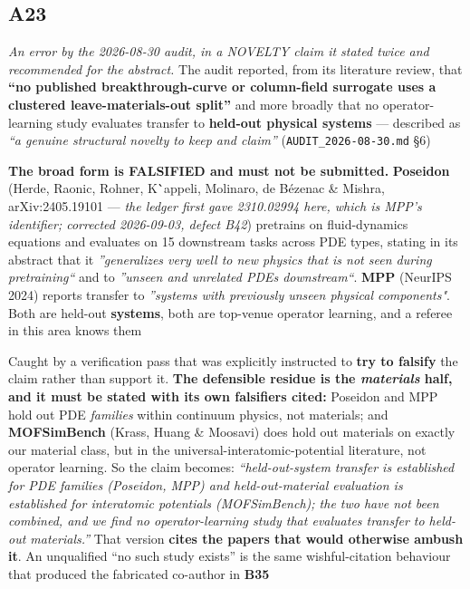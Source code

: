\documentclass[10pt]{article}
\begin{document}
\subsection*{A23}\label{led:A23}
\begin{description}[leftmargin=0pt,itemsep=1pt]
\item[Claim withdrawn.] \emph{An error by the 2026-08-30 audit, in a NOVELTY claim it stated twice and recommended for the abstract.} The audit reported, from its literature review, that \textbf{``no published breakthrough-curve or column-field surrogate uses a clustered leave-materials-out split''} and more broadly that no operator-learning study evaluates transfer to \textbf{held-out physical systems} --- described as \emph{``a genuine structural novelty to keep and claim''} (\texttt{AUDIT\_2026-08-30.md} §6)
\item[Replaced with.] \textbf{The broad form is FALSIFIED and must not be submitted.} \textbf{Poseidon} (Herde, Raonic, Rohner, K\``appeli, Molinaro, de B\'ezenac \& Mishra, arXiv:2405.19101 --- \emph{the ledger first gave 2310.02994 here, which is MPP's identifier; corrected 2026-09-03, defect B42}) pretrains on fluid-dynamics equations and evaluates on 15 downstream tasks across PDE types, stating in its abstract that it \emph{''generalizes very well to new physics that is not seen during pretraining``} and to \emph{''unseen and unrelated PDEs downstream``}. \textbf{MPP} (NeurIPS 2024) reports transfer to \emph{''systems with previously unseen physical components"}. Both are held-out \textbf{systems}, both are top-venue operator learning, and a referee in this area knows them
\item[Why it was wrong.] Caught by a verification pass that was explicitly instructed to \textbf{try to falsify} the claim rather than support it. \textbf{The defensible residue is the \emph{materials} half, and it must be stated with its own falsifiers cited:} Poseidon and MPP hold out PDE \emph{families} within continuum physics, not materials; and \textbf{MOFSimBench} (Krass, Huang \& Moosavi) does hold out materials on exactly our material class, but in the universal-interatomic-potential literature, not operator learning. So the claim becomes: \emph{``held-out-system transfer is established for PDE families (Poseidon, MPP) and held-out-material evaluation is established for interatomic potentials (MOFSimBench); the two have not been combined, and we find no operator-learning study that evaluates transfer to held-out materials.''} That version \textbf{cites the papers that would otherwise ambush it}. An unqualified ``no such study exists'' is the same wishful-citation behaviour that produced the fabricated co-author in \textbf{B35}
\end{description}
\end{document}
